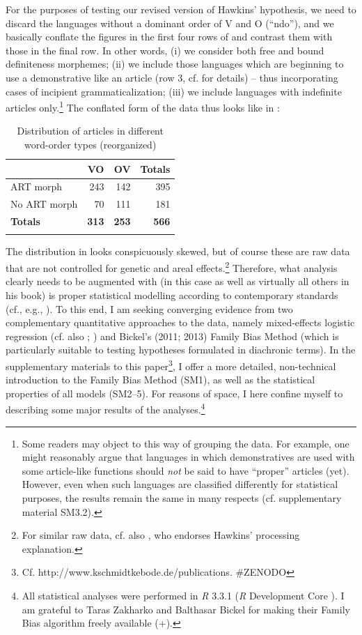 \documentclass[output=paper]{langsci/langscibook}
\begin{document}
For the purposes of testing our revised version of Hawkins’ hypothesis, we need to discard the languages without a dominant order of V and O (“ndo”), and we basically conflate the figures in the first four rows of  and contrast them with those in the final row. In other words, (i) we consider both free and bound definiteness morphemes; (ii) we include those languages which are beginning to use a demonstrative like an article (row 3, cf. \citealt{Dryer2013a} for details) – thus incorporating cases of incipient grammaticalization; (iii) we include languages with indefinite articles only.\footnote{Some readers may object to this way of grouping the data. For example, one might reasonably argue that languages in which demonstratives are used with some article-like functions should \textit{not} be said to have “proper” articles (yet). However, even when such languages are classified differently for statistical purposes, the results remain the same in many respects (cf. supplementary material SM3.2).} The conflated form of the data thus looks like in :

\begin{table} 

\begin{tabularx}{.8\textwidth}{Xrrr}
\lsptoprule
& VO  & OV & Totals\\
\midrule
ART morph & 243 & 142 & 395\\
No ART morph & 70 & 111 & 181\\
\textbf{Totals} & \textbf{313} & \textbf{253} & \textbf{566}\\
\lspbottomrule
\end{tabularx} 
\caption{Distribution of articles in different word-order types (reorganized)}
\label{tab:ksb:2}
\end{table} 

The distribution in  looks conspicuously skewed, but of course these are raw data that are not controlled for genetic and areal effects.\footnote{For similar raw data, cf. also \citet{Dryer2009}, who endorses Hawkins’ processing explanation.} Therefore, what  analysis clearly needs to be augmented with (in this case as well as virtually all others in his book) is proper statistical modelling according to contemporary standards (cf., e.g., \citealt{Bickel2011}). To this end, I am seeking converging evidence from two complementary quantitative approaches to the data, namely mixed-effects logistic regression (cf. also \citealt{Cysouw2010}; \citealt{JaegerEtAl2011}) and Bickel’s (2011; 2013) Family Bias Method (which is particularly suitable to testing hypotheses formulated in diachronic terms). In the supplementary materials to this paper\footnote{Cf. http://www.kschmidtkebode.de/publications. \#ZENODO}, I offer a more detailed, non-technical introduction to the Family Bias Method (SM1), as well as the statistical properties of all models (SM2–5). For reasons of space, I here confine myself to describing some major results of the analyses.\footnote{All statistical analyses were performed in \textit{R} 3.3.1 (\textit{R} Development Core \citealt{Team2016}). I am grateful to Taras Zakharko and Balthasar Bickel for making their Family Bias algorithm freely available (\citealt{ZakharkoBickel2011}+).}
\end{document}
